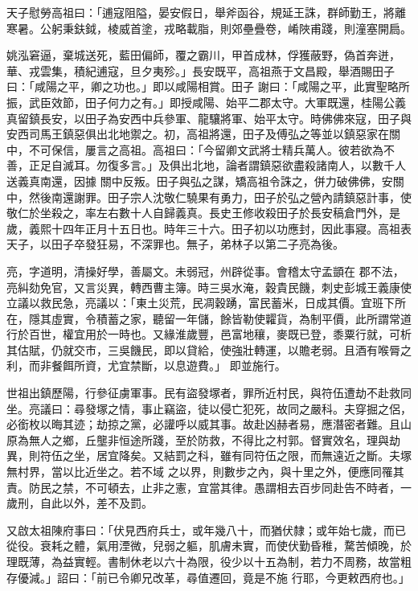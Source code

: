 \begin{pinyinscope}
 天子慰勞高祖曰：「逋寇阻隘，晏安假日，舉斧函谷，規延王誅，群師勤王，將離寒暑。公躬秉鈇鉞，棱威首塗，戎略載脂，則郊壘疊卷，崤陜甫踐，則潼塞開扃。



 姚泓窘逼，棄城送死，藍田偏師，覆之霸川，甲首成林，俘獲蔽野，偽首奔迸，華、戎雲集，積紀逋寇，旦夕夷殄。」長安既平，高祖燕于文昌殿，舉酒賜田子曰：「咸陽之平，卿之功也。」即以咸陽相賞。田子
 謝曰：「咸陽之平，此實聖略所振，武臣效節，田子何力之有。」即授咸陽、始平二郡太守。大軍既還，桂陽公義真留鎮長安，以田子為安西中兵參軍、龍驤將軍、始平太守。時佛佛來寇，田子與安西司馬王鎮惡俱出北地禦之。初，高祖將還，田子及傅弘之等並以鎮惡家在關中，不可保信，屢言之高祖。高祖曰：「今留卿文武將士精兵萬人。彼若欲為不善，正足自滅耳。勿復多言。」及俱出北地，論者謂鎮惡欲盡殺諸南人，以數千人送義真南還，因據
 關中反叛。田子與弘之謀，矯高祖令誅之，併力破佛佛，安關中，然後南還謝罪。田子宗人沈敬仁驍果有勇力，田子於弘之營內請鎮惡計事，使敬仁於坐殺之，率左右數十人自歸義真。長史王修收殺田子於長安稿倉門外，是歲，義熙十四年正月十五日也。時年三十六。田子初以功應封，因此事寢。高祖表天子，以田子卒發狂易，不深罪也。無子，弟林子以第二子亮為後。



 亮，字道明，清操好學，善屬文。未弱冠，州辟從事。會稽太守孟顗在
 郡不法，亮糾劾免官，又言災異，轉西曹主簿。時三吳水淹，穀貴民饑，刺史彭城王義康使立議以救民急，亮議以：「東土災荒，民凋穀踴，富民蓄米，日成其價。宜班下所在，隱其虛實，令積蓄之家，聽留一年儲，餘皆勒使糶貨，為制平價，此所謂常道行於百世，權宜用於一時也。又緣淮歲豐，邑富地穰，麥既已登，黍粟行就，可析其估賦，仍就交市，三吳饑民，即以貸給，使強壯轉運，以贍老弱。且酒有喉脣之利，而非餐餌所資，尤宜禁斷，以息遊費。」
 即並施行。



 世祖出鎮歷陽，行參征虜軍事。民有盜發塚者，罪所近村民，與符伍遭劫不赴救同坐。亮議曰：尋發塚之情，事止竊盜，徒以侵亡犯死，故同之嚴科。夫穿掘之侶，必銜枚以晦其迹；劫掠之黨，必讙呼以威其事。故赴凶赫者易，應潛密者難。且山原為無人之鄉，丘壟非恒途所踐，至於防救，不得比之村郭。督實效名，理與劫異，則符伍之坐，居宜降矣。又結罰之科，雖有同符伍之限，而無遠近之斷。夫塚無村界，當以比近坐之。若不域
 之以界，則數步之內，與十里之外，便應同罹其責。防民之禁，不可頓去，止非之憲，宜當其律。愚謂相去百步同赴告不時者，一歲刑，自此以外，差不及罰。



 又啟太祖陳府事曰：「伏見西府兵士，或年幾八十，而猶伏隸；或年始七歲，而已從役。衰耗之體，氣用湮微，兒弱之軀，肌膚未實，而使伏勤昏稚，騖苦傾晚，於理既薄，為益實輕。書制休老以六十為限，役少以十五為制，若力不周務，故當粗存優減。」詔曰：「前已令卿兄改革，尋值遷回，竟是不施
 行耶，今更敕西府也。」




\end{pinyinscope}
